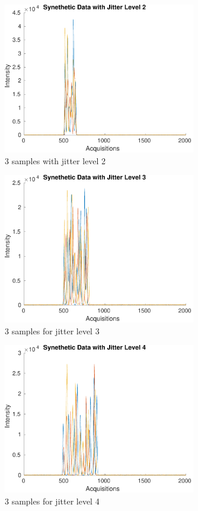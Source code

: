 \documentclass[preprint,12pt]{elsarticle}
\begin{document}
\begin{figure}[h]
    \centering
    \includegraphics[width=0.75\textwidth]{figures/jitter_illustration2.pdf}
    \caption{3 samples with jitter level 2}
    \label{fig:figure2}
\end{figure}

\begin{figure}[h]
    \centering
    \includegraphics[width=0.75\textwidth]{figures/jitter_illustration3.pdf}
    \caption{3 samples for jitter level 3}
    \label{fig:figure3}
\end{figure}

\begin{figure}[h]
    \centering
    \includegraphics[width=0.75\textwidth]{figures/jitter_illustration4.pdf}
    \caption{3 samples for jitter level 4}
    \label{fig:figure4}
\end{figure}
\end{document}
